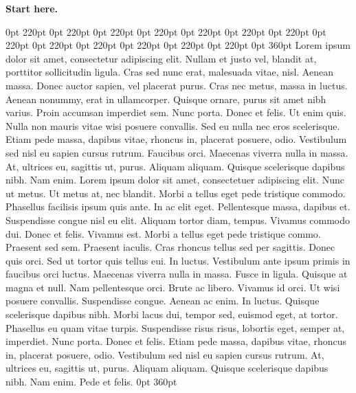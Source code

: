 \documentclass[a4paper,11pt]{article}
\begin{document}
\vspace*{3cm}
\noindent\textbf{Start here.}\par
{} 0pt 220pt 0pt 220pt 0pt 220pt 0pt 220pt 0pt 220pt 0pt 220pt 0pt 220pt 0pt 220pt 0pt 220pt 0pt 220pt 0pt 220pt 0pt 220pt 0pt 220pt 0pt 360pt
Lorem ipsum dolor sit amet, consectetur adipiscing elit. Nullam et justo vel, blandit at, porttitor sollicitudin ligula. Cras sed nunc erat, malesuada vitae, nisl. Aenean massa. Donec auctor sapien, vel placerat purus. Cras nec metus, massa in luctus. Aenean nonummy, erat in ullamcorper. Quisque ornare, purus sit amet nibh varius. Proin accumsan imperdiet sem. Nunc porta. Donec et felis. Ut enim quis. Nulla non mauris vitae wisi posuere convallis. Sed eu nulla nec eros scelerisque. Etiam pede massa, dapibus vitae, rhoncus in, placerat posuere, odio. Vestibulum sed nisl eu sapien cursus rutrum. Faucibus orci. Maecenas viverra nulla in massa. At, ultrices eu, sagittis ut, purus. Aliquam aliquam. Quisque scelerisque dapibus nibh. Nam enim. Lorem ipsum dolor sit amet, consectetuer adipiscing elit. Nunc ut metus. Ut metus at, nec blandit. Morbi a tellus eget pede tristique commodo. Phasellus facilisis ipsum quis ante. In ac elit eget. Pellentesque massa, dapibus et. Suspendisse congue nisl eu elit. Aliquam tortor diam, tempus. Vivamus commodo dui. Donec et felis. Vivamus est. Morbi a tellus eget pede tristique commo. Praesent sed sem. Praesent iaculis. Cras rhoncus tellus sed per sagittis. Donec quis orci. Sed ut tortor quis tellus eui. In luctus. Vestibulum ante ipsum primis in faucibus orci luctus. Maecenas viverra nulla in massa. Fusce in ligula. Quisque at magna et null. Nam pellentesque orci. Brute ac libero. Vivamus id orci. Ut wisi posuere convallis. Suspendisse congue. Aenean ac enim. In luctus. Quisque scelerisque dapibus nibh. Morbi lacus dui, tempor sed, euismod eget, at tortor. Phasellus eu quam vitae turpis. Suspendisse risus risus, lobortis eget, semper at, imperdiet. Nunc porta. Donec et felis. Etiam pede massa, dapibus vitae, rhoncus in, placerat posuere, odio. Vestibulum sed nisl eu sapien cursus rutrum. At, ultrices eu, sagittis ut, purus. Aliquam aliquam. Quisque scelerisque dapibus nibh. Nam enim. Pede et felis.
 0pt 360pt
\end{document}
